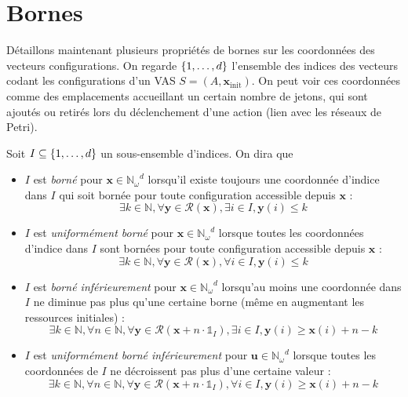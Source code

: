 \documentclass[a4paper,final]{article}
\theoremstyle{definition}
\let\leq\leqslant
\let\geq\geqslant
\newcommand{\os}[1]{\left\{\mathinner{#1}\right\}}
\newcommand{\N}{\ensuremath{\mathbb{N}}}
\newcommand{\Nomega}{\ensuremath{\mathbb{N}_\omega}}
\newcommand{\indicatrice}[1]{\ensuremath{\mathds{1}_{#1}}}
\newcommand{\lang}{\ensuremath{\mathcal{L}}}
\newcommand{\vect}[1]{\ensuremath{\mathbf{#1}}}
\newcommand{\conf}[1]{\ensuremath{\mathcal{R}(#1)}}
\newcommand{\xinit}{\ensuremath{\vect{x}_\text{init}}}
\begin{document}



\section{Bornes}

Détaillons maintenant plusieurs propriétés de bornes sur les coordonnées des vecteurs configurations.
On regarde $\os{1,\dots,d}$ l'ensemble des indices des vecteurs codant les configurations d'un VAS $S=(A,\xinit)$.
On peut voir ces coordonnées comme des emplacements accueillant un certain nombre de jetons, qui sont ajoutés ou retirés lors du déclenchement d'une action (lien avec les réseaux de Petri).

Soit $I\subseteq \os{1,\dots,d}$ un sous-ensemble d'indices.
On dira que
\begin{itemize}
    \item $I$ est \emph{borné} pour $\vect{x}\in \Nomega^d$ lorsqu'il existe toujours une coordonnée d'indice dans $I$ qui soit bornée pour toute configuration accessible depuis $\vect{x}$ :
    $$\exists k\in\N, \forall \vect{y}\in\conf{\vect{x}}, \exists i\in I, \vect{y}(i)\leq k$$
    
    \item $I$ est \emph{uniformément borné} pour $\vect{x}\in \Nomega^d$ lorsque toutes les coordonnées d'indice dans $I$ sont bornées pour toute configuration accessible depuis $\vect{x}$ :
    $$\exists k\in\N, \forall \vect{y}\in\conf{\vect{x}}, \forall i\in I, \vect{y}(i)\leq k$$
    
    \item $I$ est \emph{borné inférieurement} pour $\vect{x}\in \Nomega^d$ lorsqu'au moins une coordonnée dans $I$ ne diminue pas plus qu'une certaine borne (même en augmentant les ressources initiales) :
    $$\exists k\in\N, \forall n\in\N, \forall \vect{y}\in\conf{\vect{x} + n\cdot\indicatrice{I}}, \exists i\in I, \vect{y}(i)\geq \vect{x}(i)+n-k$$
    
    \item $I$ est \emph{uniformément borné inférieurement} pour $\vect{u}\in \Nomega^d$ lorsque toutes les coordonnées de $I$ ne décroissent pas plus d'une certaine valeur :
    $$\exists k\in\N, \forall n\in\N, \forall \vect{y}\in\conf{\vect{x} + n\cdot\indicatrice{I}}, \forall i\in I, \vect{y}(i)\geq \vect{x}(i)+n-k$$
\end{itemize}
\end{document}
